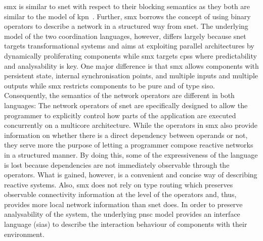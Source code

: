 \Gls*{smx} is similar to \gls*{snet} with respect to their blocking semantics as they both are similar to the model of \gls{kpn}~\cite{kahn1974}.
Further, \Gls*{smx} borrows the concept of using binary operators to describe a network in a structured way from \gls*{snet}.
The underlying model of the two coordination languages, however, differs largely because \gls*{snet} targets transformational systems and aims at exploiting parallel architectures by dynamically proliferating components while \gls*{smx} targets \glspl{cps} where predictability and analysability is key.
One major difference is that \gls*{smx} allows components with persistent state, internal synchronisation points, and multiple inputs and multiple outputs while \gls*{smx} restricts components to be pure and of type \gls{siso}.
Consequently, the semantics of the network operators are different in both languages:
The network operators of \gls*{snet} are specifically designed to allow the programmer to explicitly control how parts of the application are executed concurrently on a multicore architecture.
While the operators in \gls*{smx} also provide information on whether there is a direct dependency between operands or not, they serve more the purpose of letting a programmer compose reactive networks in a structured manner.
By doing this, some of the expressiveness of the language is lost because dependencies are not immediately observable through the operators.
What is gained, however, is a convenient and concise way of describing reactive systems.
Also, \gls*{smx} does not rely on type routing which preserves observable connectivity information at the level of the operators and, thus, provides more local network information than \gls*{snet} does.
In order to preserve analysability of the system, the underlying \gls{pnsc} model provides an interface language (\glspl{sia}) to describe the interaction behaviour of components with their environment.

